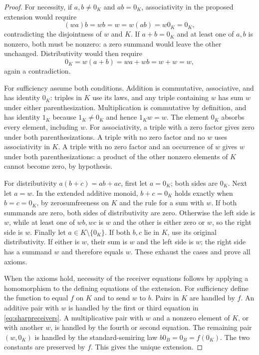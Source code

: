 \documentclass[11pt]{article}
\theoremstyle{definition}
\begin{document}
\begin{proof}
For necessity, if \(a,b\ne0_K\) and \(ab=0_K\), associativity in
the proposed extension would require
\[
 (wa)b=wb=w=w(ab)=w0_K=0_K,
\]
contradicting the disjointness of \(w\) and \(K\). If \(a+b=0_K\)
and at least one of \(a,b\) is nonzero, both must be nonzero: a zero
summand would leave the other unchanged. Distributivity would then require
\[
 0_K=w(a+b)=wa+wb=w+w=w,
\]
again a contradiction.

For sufficiency assume both conditions. Addition is commutative,
associative, and has identity \(0_K\): triples in \(K\) use its laws,
and any triple containing \(w\) has sum \(w\) under either
parenthesization. Multiplication is commutative by definition, and has
identity \(1_K\) because \(1_K\ne0_K\) and hence \(1_Kw=w\).
The element \(0_K\) absorbs every element, including \(w\).
For associativity, a triple with a zero factor gives zero under both
parenthesizations. A triple with no zero factor and no \(w\) uses
associativity in \(K\). A triple with no zero factor and an occurrence
of \(w\) gives \(w\) under both parenthesizations: a product of the
other nonzero elements of \(K\) cannot become zero, by hypothesis.

For distributivity \(a(b+c)=ab+ac\), first let \(a=0_K\); both sides
are \(0_K\). Next let \(a=w\). In the extended additive monoid,
\(b+c=0_K\) holds exactly when \(b=c=0_K\), by zerosumfreeness
on \(K\) and the rule for a sum with \(w\). If both summands are
zero, both sides of distributivity are zero. Otherwise the left side
is \(w\), while at least one of \(wb,wc\) is \(w\) and the other
is either zero or \(w\), so the right side is \(w\). Finally let
\(a\in K\setminus\{0_K\}\). If both \(b,c\) lie in \(K\), use
its original distributivity. If either is \(w\), their sum is \(w\)
and the left side is \(w\); the right side has a summand \(w\) and
therefore equals \(w\). These exhaust the cases and prove all axioms.

When the axioms hold, necessity of the receiver equations follows by
applying a homomorphism to the defining equations of the extension.
For sufficiency define the function to equal \(f\) on \(K\) and to
send \(w\) to \(b\). Pairs in \(K\) are handled by \(f\). An
additive pair with \(w\) is handled by the first or third equation
in \eqref{eq:sharpreceivers}. A multiplicative pair with \(w\) and
a nonzero element of \(K\), or with another \(w\), is handled by
the fourth or second equation. The remaining pair \((w,0_K)\) is
handled by the standard-semiring law \(b0_B=0_B=f(0_K)\).
The two constants are preserved by \(f\). This gives the unique extension.


\end{proof}
\end{document}
